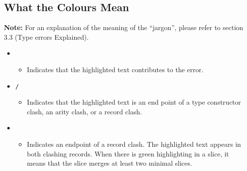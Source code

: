 \documentclass{report}
\begin{document}

\newpage


\subsection{What the Colours Mean}


\textbf{Note:} For an explanation of the meaning of the ``jargon'', please
refer to section 3.3 (Type errors Explained).

\begin{itemize}

\item \texttt{}

\begin{itemize}
\item Indicates that the highlighted text contributes to the error.
\end{itemize}

\item \texttt{/}


\begin{itemize}
\item Indicates that the highlighted text is an end point of a
  type constructor clash, an arity clash, or a record clash.


\end{itemize}

\item \texttt{}


\begin{itemize}
\item Indicates an endpoint of a record clash. The highlighted text
  appears in both clashing records. When there is green
  highlighting in a slice, it means that the slice merges at least two
  minimal slices.
\end{itemize}



\end{itemize}
\end{document}
